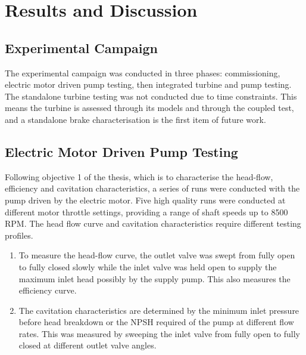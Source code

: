\section{Results and Discussion}
\label{sec:results}



\subsection{Experimental Campaign}

The experimental campaign was conducted in three phases: commissioning, electric motor driven pump testing, then integrated turbine and pump testing. The standalone turbine testing was not conducted due to time constraints. This means the turbine is assessed through its models and through the coupled test, and a standalone brake characterisation is the first item of future work.

\subsection{Electric Motor Driven Pump Testing}

Following objective 1 of the thesis, which is to characterise the head-flow, efficiency and cavitation characteristics, a series of runs were conducted with the pump driven by the electric motor. Five high quality runs were conducted at different motor throttle settings, providing a range of shaft speeds up to 8500 RPM. The head flow curve and cavitation characteristics require different testing profiles.

\begin{enumerate}
    \item To measure the head-flow curve, the outlet valve was swept from fully open to fully closed slowly while the inlet valve was held open to supply the maximum inlet head possibly by the supply pump. This also measures the efficiency curve.
    \item The cavitation characteristics are determined by the minimum inlet pressure before head breakdown or the NPSH required of the pump at different flow rates. This was measured by sweeping the inlet valve from fully open to fully closed at different outlet valve angles.
\end{enumerate}

